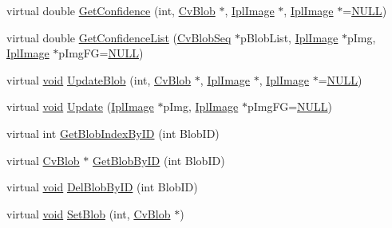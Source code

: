 \begin{DoxyCompactItemize}
virtual double \hyperlink{classCvBlobTracker_abc4868e6c7d29b7ad41f2a7113ea681e}{Get\-Confidence} (int, \hyperlink{structCvBlob}{Cv\-Blob} $\ast$, \hyperlink{core_2types__c_8h_a249298f383f3b430b476542076320c57}{Ipl\-Image} $\ast$, \hyperlink{core_2types__c_8h_a249298f383f3b430b476542076320c57}{Ipl\-Image} $\ast$=\hyperlink{Config_8cpp_a070d2ce7b6bb7e5c05602aa8c308d0c4}{N\-U\-L\-L})
\item 
virtual double \hyperlink{classCvBlobTracker_af953af7064962504024a958621d02b75}{Get\-Confidence\-List} (\hyperlink{classCvBlobSeq}{Cv\-Blob\-Seq} $\ast$p\-Blob\-List, \hyperlink{core_2types__c_8h_a249298f383f3b430b476542076320c57}{Ipl\-Image} $\ast$p\-Img, \hyperlink{core_2types__c_8h_a249298f383f3b430b476542076320c57}{Ipl\-Image} $\ast$p\-Img\-F\-G=\hyperlink{Config_8cpp_a070d2ce7b6bb7e5c05602aa8c308d0c4}{N\-U\-L\-L})
\item 
virtual \hyperlink{legacy_8hpp_a8bb47f092d473522721002c86c13b94e}{void} \hyperlink{classCvBlobTracker_aced0d90a7e6ea823a63354ec30371505}{Update\-Blob} (int, \hyperlink{structCvBlob}{Cv\-Blob} $\ast$, \hyperlink{core_2types__c_8h_a249298f383f3b430b476542076320c57}{Ipl\-Image} $\ast$, \hyperlink{core_2types__c_8h_a249298f383f3b430b476542076320c57}{Ipl\-Image} $\ast$=\hyperlink{Config_8cpp_a070d2ce7b6bb7e5c05602aa8c308d0c4}{N\-U\-L\-L})
\item 
virtual \hyperlink{legacy_8hpp_a8bb47f092d473522721002c86c13b94e}{void} \hyperlink{classCvBlobTracker_a4cf0d94eefb310825912e5dd49d42e49}{Update} (\hyperlink{core_2types__c_8h_a249298f383f3b430b476542076320c57}{Ipl\-Image} $\ast$p\-Img, \hyperlink{core_2types__c_8h_a249298f383f3b430b476542076320c57}{Ipl\-Image} $\ast$p\-Img\-F\-G=\hyperlink{Config_8cpp_a070d2ce7b6bb7e5c05602aa8c308d0c4}{N\-U\-L\-L})
\item 
virtual int \hyperlink{classCvBlobTracker_ac6433eb3c68329dd01d09219477e4dd1}{Get\-Blob\-Index\-By\-I\-D} (int Blob\-I\-D)
\item 
virtual \hyperlink{structCvBlob}{Cv\-Blob} $\ast$ \hyperlink{classCvBlobTracker_a387ed099a6fa47941feed6e433b635e1}{Get\-Blob\-By\-I\-D} (int Blob\-I\-D)
\item 
virtual \hyperlink{legacy_8hpp_a8bb47f092d473522721002c86c13b94e}{void} \hyperlink{classCvBlobTracker_a0f4a42c75e109ce6782086be87cf9862}{Del\-Blob\-By\-I\-D} (int Blob\-I\-D)
\item 
virtual \hyperlink{legacy_8hpp_a8bb47f092d473522721002c86c13b94e}{void} \hyperlink{classCvBlobTracker_ae376282fcc824bcb5338f96917d83c51}{Set\-Blob} (int, \hyperlink{structCvBlob}{Cv\-Blob} $\ast$)

\end{DoxyCompactItemize}
